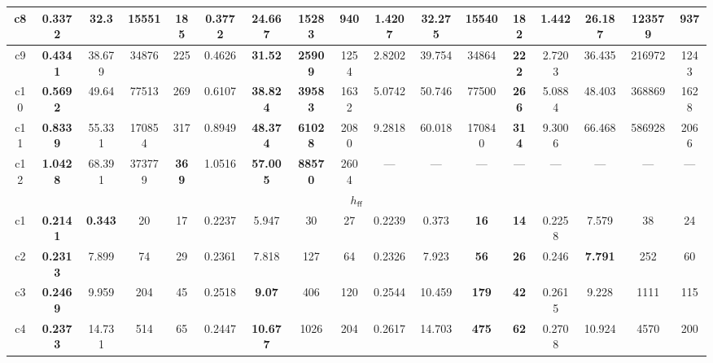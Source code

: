\begin{tabular}{||c||c|c|c|c|c|c|c|c|c|c|c|c|c|c|c|c||}
\hline%
c8&\small{\textbf{0.3372}}&\small{32.3}&\small{15551}&\small{185}&\small{0.3772}&\small{\textbf{24.667}}&\small{\textbf{15283}}&\small{940}&\small{1.4207}&\small{32.275}&\small{15540}&\small{\textbf{182}}&\small{1.442}&\small{26.187}&\small{123579}&\small{937}\\%
\hline%
c9&\small{\textbf{0.4341}}&\small{38.679}&\small{34876}&\small{225}&\small{0.4626}&\small{\textbf{31.52}}&\small{\textbf{25909}}&\small{1254}&\small{2.8202}&\small{39.754}&\small{34864}&\small{\textbf{222}}&\small{2.7203}&\small{36.435}&\small{216972}&\small{1243}\\%
\hline%
c10&\small{\textbf{0.5692}}&\small{49.64}&\small{77513}&\small{269}&\small{0.6107}&\small{\textbf{38.824}}&\small{\textbf{39583}}&\small{1632}&\small{5.0742}&\small{50.746}&\small{77500}&\small{\textbf{266}}&\small{5.0884}&\small{48.403}&\small{368869}&\small{1628}\\%
\hline%
c11&\small{\textbf{0.8339}}&\small{55.331}&\small{170854}&\small{317}&\small{0.8949}&\small{\textbf{48.374}}&\small{\textbf{61028}}&\small{2080}&\small{9.2818}&\small{60.018}&\small{170840}&\small{\textbf{314}}&\small{9.3006}&\small{66.468}&\small{586928}&\small{2066}\\%
\hline%
c12&\small{\textbf{1.0428}}&\small{68.391}&\small{373779}&\small{\textbf{369}}&\small{1.0516}&\small{\textbf{57.005}}&\small{\textbf{88570}}&\small{2604}&\small{---}&\small{---}&\small{---}&\small{---}&\small{---}&\small{---}&\small{---}&\small{---}\\%
\hline%
\multicolumn{17}{||c||}{$h_{\mathsf{ff}}$}\\%
\hline%
c1&\small{\textbf{0.2141}}&\small{\textbf{0.343}}&\small{20}&\small{17}&\small{0.2237}&\small{5.947}&\small{30}&\small{27}&\small{0.2239}&\small{0.373}&\small{\textbf{16}}&\small{\textbf{14}}&\small{0.2258}&\small{7.579}&\small{38}&\small{24}\\%
\hline%
c2&\small{\textbf{0.2313}}&\small{7.899}&\small{74}&\small{29}&\small{0.2361}&\small{7.818}&\small{127}&\small{64}&\small{0.2326}&\small{7.923}&\small{\textbf{56}}&\small{\textbf{26}}&\small{0.246}&\small{\textbf{7.791}}&\small{252}&\small{60}\\%
\hline%
c3&\small{\textbf{0.2469}}&\small{9.959}&\small{204}&\small{45}&\small{0.2518}&\small{\textbf{9.07}}&\small{406}&\small{120}&\small{0.2544}&\small{10.459}&\small{\textbf{179}}&\small{\textbf{42}}&\small{0.2615}&\small{9.228}&\small{1111}&\small{115}\\%
\hline%
c4&\small{\textbf{0.2373}}&\small{14.731}&\small{514}&\small{65}&\small{0.2447}&\small{\textbf{10.677}}&\small{1026}&\small{204}&\small{0.2617}&\small{14.703}&\small{\textbf{475}}&\small{\textbf{62}}&\small{0.2708}&\small{10.924}&\small{4570}&\small{200}\\%

\end{tabular}
